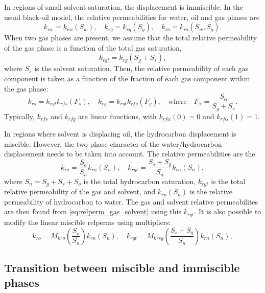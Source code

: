 \documentclass[11pt, a4paper]{article}
\begin{document}
In regions of small solvent saturation, the displacement is immiscible. In the usual black-oil
model, the relative permeabilities for water, oil and gas phases are
\begin{equation*}
  k_{rw} = k_{rw}(S_w), \quad k_{rg} = k_{rg}(S_g), \quad k_{ro} = k_{ro}(S_w, S_g).
\end{equation*}
When two gas phases are present, we assume that the total relative permeability of the gas phase is
a function of the total gas saturation,
\begin{equation*}
  k_{rgt} = k_{rg}(S_g + S_s),
\end{equation*}
where $S_s$ is the solvent saturation. Then, the relative permeability of each gas component is
taken as a function of the fraction of each gas component within the gas phase:
\begin{equation}
  \label{eq:relperm_gas_solvent}
  k_{rs} = k_{rgt}k_{rfs}(F_s), \quad k_{rg} = k_{rgt}k_{rfg}(F_g), \quad \text{where}
  \quad F_\alpha = \frac{S_\alpha}{S_g + S_s}.
\end{equation}
Typically, $k_{rfs}$ and $k_{rfg}$ are linear functions, with $k_{rf\alpha}(0) = 0$ and $k_{rf\alpha}(1) = 1$.

In regions where solvent is displacing oil, the hydrocarbon displacement is miscible. However, the
two-phase character of the water/hydrocarbon displacement needs to be taken into account. The
relative permeabilities are the
\begin{equation}
  \label{eq:miscible_relperms}
  k_{ro} = \frac{S_o}{S_n}k_{rn}(S_n), \quad k_{rgt} = \frac{S_s + S_g}{S_n}k_{rn}(S_n),
\end{equation}
where $S_n = S_g + S_s + S_o$ is the total hydrocarbon saturation, $k_{rgt}$ is the total relative
permeability of the gas and solvent, and $k_{rn}(S_n)$ is the relative permeability of hydrocarbon
to water. The gas and solvent relative permeabilites are then found from
\eqref{eq:relperm_gas_solvent} using this $k_{rgt}$. It is also possible to modify the linear
miscible relperms using multipliers:
\begin{equation*}
  k_{ro} = M_{kro}\left(\frac{S_o}{S_n}\right)k_{rn}(S_n), \quad k_{rgt} = M_{krsg}\left(\frac{S_s + S_g}{S_n}\right)k_{rn}(S_n),
\end{equation*}

\subsection*{Transition between miscible and immiscible phases}
\end{document}
